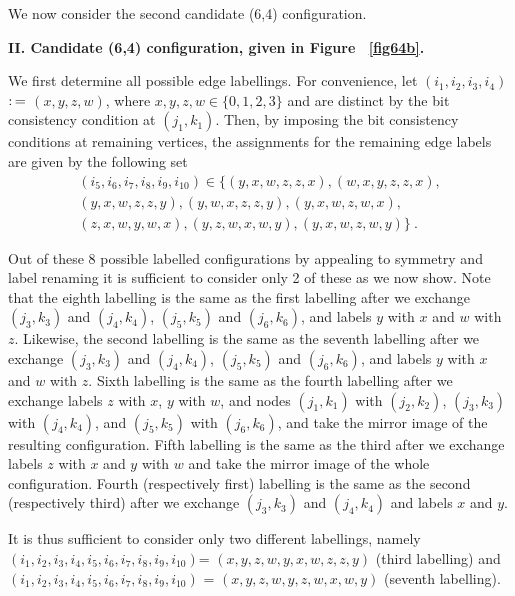 
We now consider the second candidate (6,4) configuration.

\textbf{II. Candidate (6,4) configuration, given in Figure
~\ref{fig64b}.}

We first determine all possible edge labellings. For convenience,
let $(i_1,i_2,i_3,i_4)$ $\asn$ $(x,y,z,w)$, where $x,y,z,w \in
\{0,1,2,3 \}$ and are distinct by the bit consistency condition at
$(j_1,k_1)$. Then, by imposing the bit consistency conditions at
remaining vertices, the assignments for the remaining edge labels
are given by the following set
\begin{equation}\label{tuples2}\begin{array}{cccc} (i_5,i_6,i_7,i_8,i_9,i_{10}) \in
 \{(y,x,w,z,z,x),(w,x,y,z,z,x),\\
 (y,x,w,z,z,y),(y,w,x,z,z,y),(y,x,w,z,w,x),\\(z,x,w,y,w,x),(y,z,w,x,w,y),(y,x,w,z,w,y)\}~.
\end{array}\end{equation}

Out of these 8 possible labelled configurations by appealing to
symmetry and label renaming it is sufficient to consider only 2 of
these as we now show. Note that the eighth labelling is the same
as the first labelling after we exchange $(j_3,k_3)$ and
$(j_4,k_4)$, $(j_5,k_5)$ and $(j_6,k_6)$, and labels $y$ with $x$
and $w$ with $z$. Likewise, the second labelling is the same as
the seventh labelling after we exchange $(j_3,k_3)$ and
$(j_4,k_4)$, $(j_5,k_5)$ and $(j_6,k_6)$, and labels $y$ with $x$
and $w$ with $z$. Sixth labelling is the same as the fourth
labelling after we exchange labels $z$ with $x$, $y$ with $w$, and
nodes $(j_1,k_1)$ with $(j_2,k_2)$, $(j_3,k_3)$ with $(j_4,k_4)$,
and $(j_5,k_5)$ with $(j_6,k_6)$, and take the mirror image of the
resulting configuration. Fifth labelling is the same as the third
after we exchange labels $z$ with $x$ and $y$ with $w$ and take
the mirror image of the whole configuration. Fourth (respectively
first) labelling is the same as the second (respectively third)
after we exchange $(j_3,k_3)$ and $(j_4,k_4)$ and labels $x$ and
$y$.

It is thus sufficient to consider only two different labellings,
namely \newline
\noindent$(i_1,i_2,i_3,i_4,i_5,i_6,i_7,i_8,i_9,i_{10})$=
$(x,y,z,w,y,x,w,z,z,y)$ (third labelling) and
\newline \noindent $(i_1,i_2,i_3,i_4,i_5,i_6,i_7,i_8,i_9,i_{10})$ =
$(x,y,z,w,y,z,w,x,w,y)$ (seventh labelling).


